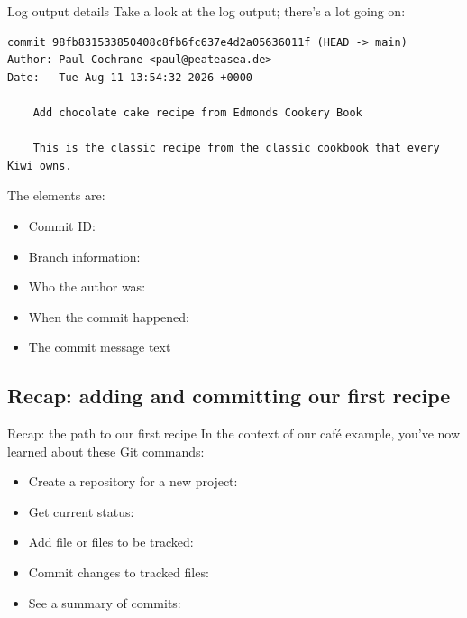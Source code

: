 \documentclass{git_course}
\begin{document}
\begin{frame}[fragile]{Log output details}
    Take a look at the log output; there's a lot going on:
    \begin{verbatim}
commit 98fb831533850408c8fb6fc637e4d2a05636011f (HEAD -> main)
Author: Paul Cochrane <paul@peateasea.de>
Date:   Tue Aug 11 13:54:32 2026 +0000

    Add chocolate cake recipe from Edmonds Cookery Book

    This is the classic recipe from the classic cookbook that every Kiwi owns.
    \end{verbatim}

    The elements are:
    \begin{itemize}
        \item Commit ID: 
        \item Branch information: 
        \item Who the author was: 
        \item When the commit happened: 
        \item The commit message text
    \end{itemize}
\end{frame}

\subsection{Recap: adding and committing our first recipe}

\begin{frame}[fragile]{Recap: the path to our first recipe}
    In the context of our café example, you've now learned about these Git
    commands:
    \begin{itemize}
        \item Create a repository for a new project: 
        \item Get current status: 
        \item Add file or files to be tracked: 
        \item Commit changes to tracked files: 
        \item See a summary of commits: 
    \end{itemize}
\end{frame}
\end{document}
